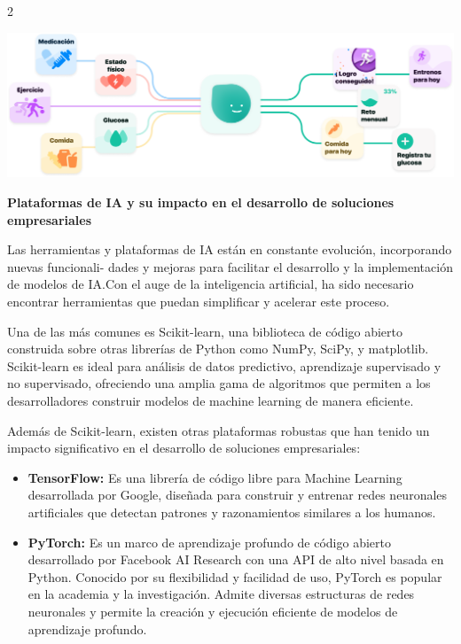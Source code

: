 \documentclass[12pt,spanish,Letterpaper,openany]{book}
\begin{document}
\begin {multicols}{2}
\begin {flushleft}
\noindent\begin{minipage}[c]{\columnwidth}

\begin{center}\includegraphics[width=1\linewidth]{imagenes_articulos/sp43_01} \end{center}

\end{minipage}
\end {flushleft}

\textbf{Plataformas de IA y su impacto en el desarrollo de soluciones empresariales}

Las herramientas y plataformas de IA están en constante evolución, incorporando nuevas funcionali-
dades y mejoras para facilitar el desarrollo y la implementación de modelos de IA.Con el auge de la inteligencia artificial, ha sido necesario encontrar herramientas que puedan simplificar y acelerar este proceso.

Una de las más comunes es Scikit-learn, una biblioteca de código abierto construida sobre otras librerías de Python como NumPy, SciPy, y matplotlib. Scikit-learn es ideal para análisis de datos predictivo, aprendizaje supervisado y no
supervisado, ofreciendo una amplia gama de algoritmos que permiten a los desarrolladores construir modelos de machine learning de manera eficiente.

Además de Scikit-learn, existen otras plataformas robustas que han tenido un impacto significativo en el desarrollo de soluciones empresariales:

\begin{itemize}
\item
  \textbf{TensorFlow:} Es una librería de código libre para Machine Learning desarrollada por Google, diseñada para construir y entrenar redes neuronales artificiales que detectan patrones y razonamientos similares a los humanos.
\item
  \textbf{PyTorch:} Es un marco de aprendizaje profundo de código abierto desarrollado por Facebook AI Research con una API de alto nivel basada en Python. Conocido por su flexibilidad y facilidad de uso, PyTorch es popular en la academia y la investigación. Admite diversas estructuras de redes neuronales y permite la creación y ejecución eficiente de modelos de aprendizaje profundo.
\end{itemize}


\end{multicols}
\end{document}
